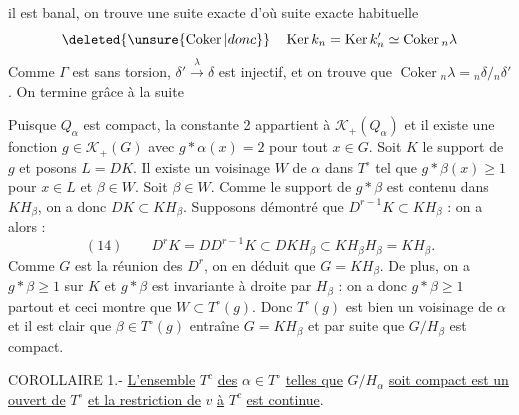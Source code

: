  il est banal, on trouve
une suite exacte
d'où   suite exacte habituelle
\[
\deleted{\unsure{\operatorname{Coker}|donc}}\quad \operatorname{Ker}k_n=\operatorname{Ker}k'_n\simeq\operatorname{Coker}{}_n\lambda
\]
Comme $\Gamma$ est sans torsion,  $\delta'\xrightarrow{\lambda}\delta$ est injectif, et on trouve que $\operatorname{Coker}{}_n\lambda={}_n\delta/{}_n\delta'$. On termine grâce à la suite

Puisque $Q_\alpha$ est compact, la constante 2 appartient à $\mathcal K_+(Q_\alpha)$ et il existe une fonction $g\in\mathcal K_+(G)$ avec $g*\alpha(x)=2$ pour tout $x\in G$. Soit $K$ le support de $g$ et posons $L=DK$. Il existe un voisinage $W$ de $\alpha$ dans $T^\circ$ tel que $g*\beta(x)\geq 1$ pour $x\in L$ et $\beta\in W$. Soit $\beta\in W$. Comme le support de $g*\beta$ est contenu dans $KH_\beta$, on a donc $DK\subset KH_\beta$. Supposons démontré que $D^{r-1}K\subset KH_\beta$ : on a alors :
\[
(14)\qquad D^rK=DD^{r-1}K\subset DKH_\beta\subset KH_\beta H_\beta=KH_\beta.
\]
Comme $G$ est la réunion des $D^r$, on en déduit que $G=KH_\beta$. De plus, on a $g*\beta\geq 1$ sur $K$ et $g*\beta$ est invariante à droite par $H_\beta$ : on a donc $g*\beta\geq 1$ partout et ceci montre que $W\subset T^\circ(g)$. Donc $T^\circ(g)$ est bien un voisinage de $\alpha$ et il est clair que $\beta\in T^\circ(g)$ entraîne $G=KH_\beta$ et par suite que $G/H_\beta$ est compact.

COROLLAIRE 1.- \uline{L'ensemble} $T^c$ \uline{des} $\alpha\in T^\circ$ \uline{telles que} $G/H_\alpha$ \uline{soit compact est un ouvert de} $T^\circ$ \uline{et la restriction de} $v$ \uline{à} $T^c$ \uline{est continue}.

